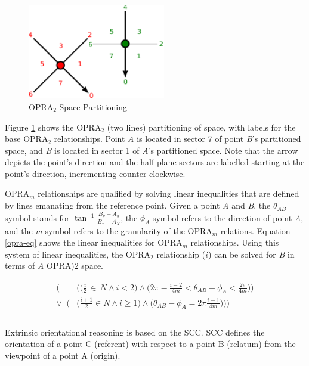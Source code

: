\documentclass[12pt]{ucthesis}
\begin{document}
\begin{figure}[b]
\centering
\includegraphics[width=60mm]{facing-opra-base-rel}
\caption{OPRA$_{2}$ Space Partitioning}
\label{facing-opra-base-rel}
\end{figure}

Figure \ref{facing-opra-base-rel} shows the OPRA$_{2}$ (two lines) partitioning of space, with labels for the base OPRA$_{2}$ relationships. Point \emph{A} is located in sector 7 of point \emph{B}'s partitioned space, and \emph{B} is located in sector 1 of \emph{A}'s partitioned space. Note that the arrow depicts the point's direction and the half-plane sectors are labelled starting at the point's direction, incrementing counter-clockwise. 

OPRA$_{m}$ relationships are qualified by solving linear inequalities that are defined by lines emanating from the reference point. Given a point \emph{A} and \emph{B}, the $\theta_{AB}$ symbol stands for $ \tan^{-1} \frac{B_{y} - A_{y}}{B_{x} - A_{X}} $, the $\phi_{A}$ symbol refers to the direction of point \emph{A}, and the \emph{m} symbol refers to the granularity of the OPRA$_{m}$ relations. Equation \ref{opra-eq} shows the linear inequalities for OPRA$_{m}$ relationships. Using this system of linear inequalities, the OPRA$_{2}$ relationship ($i$) can be solved for \emph{B} in terms of \emph{A} OPRA$){2}$ space.

\begin{equation}\label{opra-eq}
\begin{aligned}
\Big(&\Big(\Big(\frac{i}{2} \, \in \, N \wedge i < 2\Big) \wedge \Big(2\pi - \frac{i-2}{4m} < \theta_{AB} - \phi_{A} < \frac{2\pi}{4m}\Big)\Big) \\
\lor \;\; \Big(&\Big(\frac{i+1}{2} \in N \wedge i \geq 1\Big) \wedge \Big(\theta_{AB} - \phi_{A} = 2\pi \frac{i-1}{4m}\Big)\Big)\Big) \\ \\
\end{aligned}
\end{equation}

Extrinsic orientational reasoning is based on the SCC. SCC defines the orientation of a point C (referent) with respect to a point B (relatum) from the viewpoint of a point A (origin).
\end{document}

